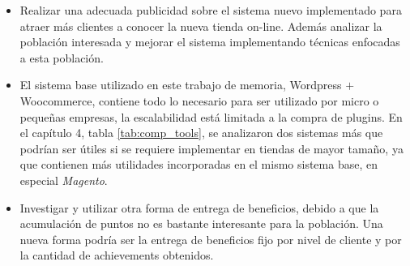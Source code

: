 \begin{itemize}

\item Realizar una adecuada publicidad sobre el sistema nuevo implementado para
	atraer más clientes a conocer la nueva tienda on-line. Además analizar
	la población interesada y mejorar el sistema implementando técnicas
	enfocadas a esta población.

\item El sistema base utilizado en este trabajo de memoria, Wordpress $+$ Woocommerce, contiene
todo lo necesario para ser utilizado por micro o pequeñas empresas, la escalabilidad está limitada
a la compra de plugins. En el capítulo 4, tabla \ref{tab:comp_tools}, se analizaron dos sistemas más
que podrían ser útiles si se requiere implementar {\GAM} en tiendas de mayor tamaño, ya que contienen
más utilidades incorporadas en el mismo sistema base, en especial \emph{Magento}.

\item Investigar y utilizar otra forma de entrega de beneficios, debido a que la
acumulación de puntos no es bastante interesante para la población. Una nueva forma podría ser la entrega
de beneficios fijo por nivel de cliente y por la cantidad de achievements obtenidos.

\end{itemize}


